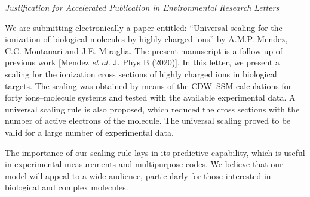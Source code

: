 \documentclass[a4paper,10pt]{letter}
\begin{document}
\pagestyle{headings}
\date{}%

\begin{letter}{}

\opening{}

\begin{center}
\it Justification for Accelerated Publication in Environmental Research Letters
\end{center}

We are submitting electronically a paper entitled:
``Universal scaling for the ionization of biological molecules by 
highly charged ions'' by A.M.P. Mendez, C.C. Montanari and J.E. Miraglia.
The present manuscript is a follow up of previous work [Mendez {\it et al.}
J. Phys B (2020)]. In this letter, we present a scaling for the 
ionization cross sections of highly charged ions in biological targets.
The scaling 
was obtained by means of the CDW--SSM calculations for forty ions--molecule
systems and tested with the available experimental 
data. 
A universal scaling rule is also proposed, which reduced the 
cross sections with the number of active electrons of the molecule. 
The universal scaling proved to be valid for a large number of 
experimental data. 

The importance of our scaling rule lays in its predictive capability, 
which is useful in experimental measurements and multipurpose codes.
We believe that our model will appeal to a wide audience, particularly 
for those interested in biological and complex molecules.

\signature{A.M.P. Mendez}



\end{letter}
\end{document}
